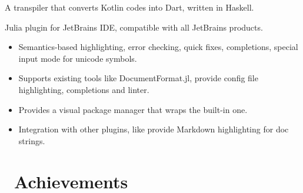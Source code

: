 \documentclass{resume}
\begin{document}
A transpiler that converts Kotlin codes into Dart, written in Haskell.

Julia plugin for JetBrains IDE, compatible with all JetBrains products.
\begin{itemize}
  \item Semantics-based highlighting, error checking, quick fixes, completions, special input mode for unicode symbols.
  \item Supports existing tools like DocumentFormat.jl, provide config file highlighting, completions and linter.
  \item Provides a visual package manager that wraps the built-in one.
  \item Integration with other plugins, like provide Markdown highlighting for doc strings.
\end{itemize}


\section{\faHeartO\ Achievements}
\end{document}
